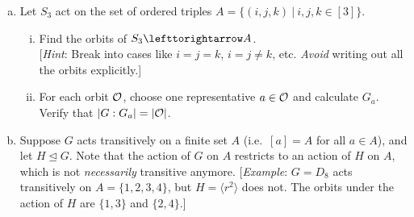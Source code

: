 \documentclass[11pt, reqno]{amsart}
\theoremstyle{plain}
\theoremstyle{definition}
\theoremstyle{example}
\def\<{\langle} \def\>{\rangle}
\def\acts{\lefttorightarrow}
\def\normeq{\unlhd}
\begin{document}
\begin{enumerate}[1.]
\begin{enumerate}[(a)]
\begin{proof}
Recall that $G_a = \{g \in G\ |\ g \cdot a = a\}$ and $G_b = \{g \in G\ |\ g \cdot b = b\}$. Now fix $g_1 \in G$ such that $b = g_1 \cdot a$ and fix $g_2 \in G_b$. Then we have, $g_2 \cdot b = g_1 \cdot a$.
\end{proof}
\item Let $S_3$ act on the set of ordered triples $A=\{(i, j, k) ~|~ i, j, k \in [3]\}$. 
\begin{enumerate}[(i)]
\item Find the orbits of $S_3 \acts A$. \\
{[\emph{Hint}: Break into cases like $i=j=k$, $i=j \neq k$, etc. \emph{Avoid} writing out all the orbits explicitly.]}
\item For each orbit $\mathcal{O}$, choose one representative $a \in \mathcal{O}$ and calculate $G_a$. Verify that $|G: G_a| = |\mathcal{O}|$. 
\end{enumerate}
\item Suppose $G$ acts transitively on a finite set $A$ (i.e.\ $[a] = A$ for all $a \in A$), and let $H \normeq G$. Note that the action of $G$ on $A$ restricts to an action of $H$ on $A$, which is not \emph{necessarily} transitive anymore. {[\emph{Example}: $G = D_8$ acts transitively on $A = \{1,2,3,4\}$, but $H = \<r^2\>$ does not. The orbits under the action of $H$ are $\{1,3\}$ and $\{2,4\}$.]}

\smallskip


\end{enumerate}
\end{enumerate}
\end{document}
